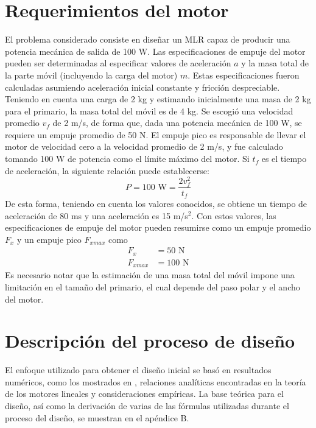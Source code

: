 \section{Requerimientos del motor}
El problema considerado consiste en diseñar un MLR capaz de producir una potencia mecánica de salida de 100 W. Las especificaciones de empuje del motor pueden ser determinadas al especificar valores de aceleración $a$ y la masa total de la parte móvil (incluyendo la carga del motor) $m$. Estas especificaciones fueron calculadas asumiendo aceleración inicial constante y fricción despreciable.
Teniendo en cuenta una carga de 2 kg y estimando inicialmente una masa de 2 kg para el primario, la masa total del móvil es de 4 kg. Se escogió una velocidad promedio $v_f$ de 2 m/s, de forma que, dada una potencia mecánica de 100 W, se requiere un empuje promedio de 50 N. El empuje pico es responsable de llevar el motor de velocidad cero a la velocidad promedio de 2 m/s, y fue calculado tomando 100 W de potencia como el límite máximo del motor. Si $t_f$ es el tiempo de aceleración, la siguiente relación puede establecerse:
\begin{equation*}
P = 100\text{ W} =
\frac{2v_f^2}{t_f}
\end{equation*}
De esta forma, teniendo en cuenta los valores conocidos, se obtiene un tiempo de aceleración de 80 ms y una aceleración es 15 m/s$^2$. Con estos valores, las especificaciones de empuje del motor pueden resumirse como un empuje promedio $F_x$ y un empuje pico $F_{xmax}$ como
\begin{align*}
F_x &= 50\text{ N}\\
F_{xmax} &= 100\text{ N}
\end{align*}
Es necesario notar que la estimación de una masa total del móvil impone una limitación en el tamaño del primario, el cual depende del paso polar y el ancho del motor.

\section{Descripción del proceso de diseño}
El enfoque utilizado para obtener el diseño inicial se basó en resultados numéricos, como los mostrados en \cite{boldea1994}, relaciones analíticas encontradas en la teoría de los motores lineales \cite{boldea2013, gieras2000} y consideraciones empíricas. La base teórica para el diseño, así como la derivación de varias de las fórmulas utilizadas durante el proceso del diseño, se muestran en el apéndice B. 

